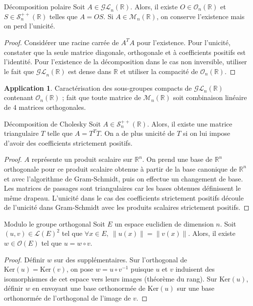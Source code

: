 \documentclass[french]{article}
\newcommand{\R}{\mathbb{R}}
\newcommand{\inv}{^{-1}}
\renewcommand{\ker}{\text{Ker}}
\theoremstyle{theorem}
\theoremstyle{definition}
\newtheorem*{app}{Application}
\begin{document}
\begin{lem}{Décomposition polaire}
	Soit $A\in\mathcal{GL}_n(\R)$. Alors, il existe $O\in\mathcal{O}_n(\R)$ et $S\in\mathcal{S}_n^{++}(\R)$ telles que $A=OS$. Si $A\in\mathcal{M}_n(\R)$, on conserve l'existence mais on perd l'unicité.
\end{lem}
\begin{proof}
	Considérer une racine carrée de $A^TA$ pour l'existence. Pour l'unicité, constater que la seule matrice diagonale, orthogonale et à coefficients positifs est l'identité. Pour l'existence de la décomposition dans le cas non inversible, utiliser le fait que $\mathcal{GL}_n(\R)$ est dense dans $\R$ et utiliser la compacité de $\mathcal{O}_n(\R)$.
\end{proof}
\begin{app}
	Caractérisation des sous-groupes compacts de $\mathcal{GL}_n(\R)$ contenant $\mathcal{O}_n(\R)$ ; fait que toute matrice de $\mathcal{M}_n(\R)$ soit combinaison linéaire de 4 matrices orthogonales.
\end{app}

\begin{lem}{Décomposition de Cholesky}
	Soit $A\in\mathcal{S}_n^{++}(\R)$. Alors, il existe une matrice triangulaire $T$ telle que $A=T^TT$. On a de plus unicité de $T$ si on lui impose d'avoir des coefficients strictement positifs. 
\end{lem}
\begin{proof}
	$A$ représente un produit scalaire sur $\R^n$. On prend une base de $\R^n$ orthogonale pour ce produit scalaire obtenue à partir de la base canonique de $\R^n$ et avec l'algorithme de Gram-Schmidt, puis on effectue un changement de base. Les matrices de passages sont triangulaires car les bases obtenues définissent le même drapeau. L'unicité dans le cas des coefficients strictement positifs découle de l'unicité dans Gram-Schmidt avec les produits scalaires strictement positifs.
\end{proof}

\begin{lem}{Modulo le groupe orthogonal}
	Soit $E$ un espace euclidien de dimension $n$. Soit $(u,v)\in\mathcal{L}(E)^2$ tel que $\forall x\in E,\ \lVert u(x)\rVert=\lVert v(x)\rVert$. Alors, il existe $w\in\mathcal{O}(E)$ tel que $u=w\circ v$.
\end{lem}
\begin{proof}
	Définir $w$ sur des supplémentaires. Sur l'orthogonal de $\ker(u)=\ker(v)$, on pose $w=u\circ v\inv$ puisque $u$ et $v$ induisent des isomorphismes de cet espace vers leurs images (théorème du rang). Sur $\ker(u)$, définir $w$ en envoyant une base orthonormée de $\ker(u)$ sur une base orthonormée de l'orthogonal de l'image de $v$.
\end{proof}
\end{document}
